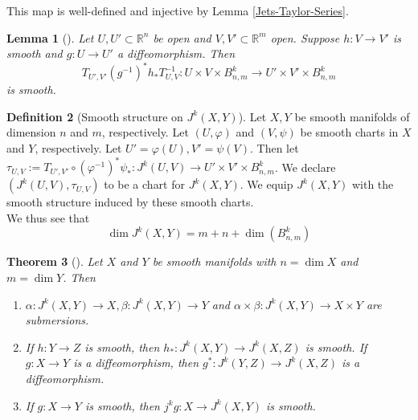 \documentclass[reqno]{amsart}
\newtheorem{theorem}{Theorem}[section]
\newtheorem{lemma}[theorem]{Lemma}
\theoremstyle{definition}
\newtheorem{definition}[theorem]{Definition}
\theoremstyle{remark}
\begin{document}
This map is well-defined and injective by 
Lemma \ref{Jets-Taylor-Series}.

\begin{lemma}[]
    Let $U, U' \subset \mathbb{R}^{n}$ be open and
    $V,V' \subset \mathbb{R}^{m}$ open.
    Suppose $h \colon V \to V'$ is smooth and
    $g \colon U \to U'$ a diffeomorphism. Then
    \[
    T_{U',V'}\left( g^{-1} \right)^{*} h_* T_{U,V}^{-1}\colon
    U \times V \times B_{n,m}^{k} \to 
    U' \times V' \times B_{n,m}^{k}
    \] 
    is smooth.
\end{lemma}


\begin{definition}[Smooth structure on
    $J^{k}(X,Y)$]
    Let $X,Y$ be smooth manifolds of dimension
    $n$ and $m$, respectively.
    Let $\left( U, \varphi  \right) $ and 
    $\left( V,\psi  \right) $ be smooth charts
    in $X$ and $Y$, respectively. Let
    $U' = \varphi (U), V' = \psi (V)$. Then
    let
    $\tau_{U,V} :=
    T_{U', V'} \circ \left( \varphi^{-1} \right)^{*}
    \psi_* \colon
    J^{k}(U,V) \to U' \times V' \times B_{n,m}^{k}$.
    We declare
    $\left( J^{k}(U,V), \tau_{U,V} \right) $ to
    be a chart for
    $J^{k}(X,Y)$. We equip
    $J^{k}(X,Y)$ with the smooth structure induced by
    these smooth charts.\\
    We thus see that
            \[
            \dim J^{k}(X,Y) = m+n+ \dim \left( B_{n,m}^{k} \right) 
            \] 
\end{definition}


\begin{theorem}[]
    Let $X$ and $Y$ be smooth manifolds with
    $n = \dim X$ and $m = \dim Y$. Then
    \begin{enumerate}
        \item $\alpha \colon J^{k}(X,Y) \to X,
            \beta \colon J^{k}(X,Y) \to Y$ and
            $\alpha \times \beta \colon
            J^{k}(X,Y) \to X \times Y$ are
            submersions.
        \item If $h \colon Y \to Z$ is smooth,
            then $h_* \colon J^{k}(X,Y) \to 
            J^{k}(X,Z)$ is smooth.
            If $g \colon X \to Y$ is a diffeomorphism,
            then $g^{*} \colon J^{k}(Y,Z)
            \to J^{k}(X,Z)$ is a diffeomorphism.
        \item If $g \colon X \to Y$ is smooth, then
            $j^{k}g \colon X \to 
            J^{k}(X,Y)$ is smooth.
    \end{enumerate}
\end{theorem}
\end{document}
